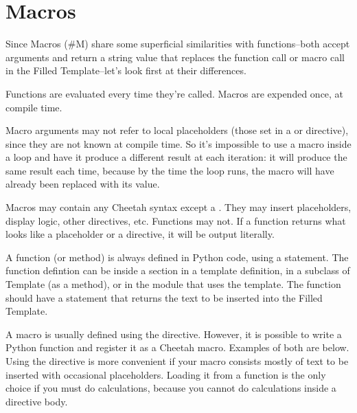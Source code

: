 \section{Macros}
\label{macros}


Since Macros (#M) share some superficial similarities with functions--both
accept arguments and return a string value that replaces the function call or
macro call in the Filled Template--let's look first at their differences.

Functions are evaluated every time they're called.  Macros are expended once,
at compile time.  

Macro arguments may not refer to local placeholders (those set in a
 or  directive), since they are not known at compile
time.  So it's impossible to use a macro inside a  loop and have
it produce a different result at each iteration: it will produce the same 
result each time, because by the time the  loop runs, the macro will
have already been replaced with its value.

Macros may contain any Cheetah syntax except a .  They
may insert placeholders, display logic, other directives, etc.  Functions may
not.  If a function returns what looks like a placeholder or a directive, it
will be output literally.

A function (or method) is always defined in Python code, using a 
statement.  The function defintion can be inside a  section in
a template definition, in a subclass of Template (as a method), or in the
module that uses the template.  The function should have a 
statement that returns the text to be inserted into the Filled Template.

A macro is usually defined using the  directive.  However, it is
possible to write a Python function and register it as a Cheetah macro.
Examples of both are below.  Using the  directive is more
convenient if your macro consists mostly of text to be inserted with occasional
placeholders.  Loading it from a function is the only choice if you must do
calculations, because you cannot do calculations inside a 
directive body.


